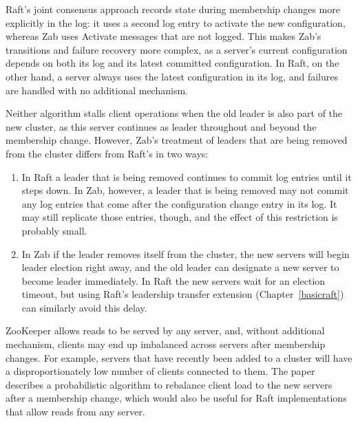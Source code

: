 Raft's joint consensus approach records state during membership changes
more explicitly in the log:
it uses a second log entry to activate the new configuration, whereas
Zab uses Activate messages that are not logged. This makes Zab's
transitions and failure recovery more complex, as a server's current
configuration depends on both its log and 
its latest committed configuration.
In Raft, on the other hand, a server always uses the latest
configuration in its log, and failures are handled with no additional
mechanism.

Neither algorithm stalls client operations when the old leader is also
part of the new cluster, as this server continues as leader throughout
and beyond the membership change. However, Zab's treatment of leaders
that are being removed from the cluster differs from Raft's in two ways:
%
\begin{enumerate}
%
\item In Raft a leader that is being removed continues to commit log
entries until it steps down. In Zab, however, a leader that is being
removed may not commit any log entries that come after the configuration
change entry in its log. It may still replicate those entries, though,
and the effect of this restriction is probably small.
%
\item In Zab if the leader removes itself from the cluster, the new
servers will begin leader election right away, and the old leader
can designate a new server to become leader immediately.
In Raft the new servers wait
for an election timeout, but using Raft's
leadership transfer extension (Chapter~\ref{basicraft}) can
similarly avoid this delay.
%
\end{enumerate}


%
%
%
%
%

ZooKeeper allows reads to be served by any server, and, without
additional mechanism, clients may end up imbalanced across servers after
membership changes. For example, servers that have recently been added
to a cluster will have a disproportionately low number of clients
connected to them. The paper describes a probabilistic algorithm to
rebalance client load to the new servers after a membership change,
which would also be useful for Raft implementations that allow reads
from any server.
